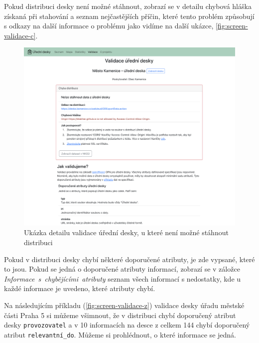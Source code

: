 Pokud distribuci desky není možné stáhnout, zobrazí se v detailu chybová
hláška získaná při stahování a seznam nejčastějších příčin, které tento
problém způsobují s odkazy na další informace o problému jako vidíme na
další ukázce, \autoref{fig:screen-validace-c}.

\begin{figure}
\centering
\includegraphics[width=\textwidth]{cs/obrazky/screenshots/validace_detail_cerveny.png}
\caption{Ukázka detailu validace úřední desky, u které není možné stáhnout distribuci}
\label{fig:screen-validace-c}
\end{figure}

Pokud v distribuci desky chybí některé doporučené atributy, je zde
vypsané, které to jsou. Pokud se jedná o doporučené atributy informací,
zobrazí se v záložce \textit{Informace\ s\ chybějícími\ atributy} seznam
všech informací s nedostatky, kde u každé informace je uvedeno, které
atributy chybí.

Na následujícím příkladu (\autoref{fig:screen-validace-z}) validace desky úřadu městské části Praha 5 si
můžeme všimnout, že v distribuci chybí doporučený atribut desky
\texttt{provozovatel} a v 10 informacích na desce z celkem 144 chybí
doporučený atribut \texttt{relevantní\_do}. Můžeme si prohlédnout, o
které informace se jedná.

